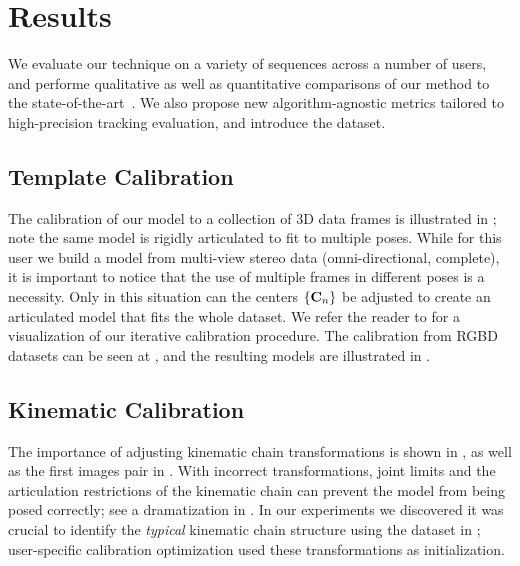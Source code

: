 
\section{Results}
\label{sec:results}
We evaluate our technique on a variety of sequences across a number of users, and performe qualitative as well as quantitative comparisons of our method to the state-of-the-art~\cite{qian2014realtime,sridhar2015fast,tagliasacchi2015robust,sharp2015accurate,taylor2016joint}. We also propose new algorithm-agnostic metrics tailored to high-precision tracking evaluation, and introduce the \handy{} dataset.

\subsection*{Template Calibration}
The calibration of our model to a collection of 3D data frames is illustrated in ; note the same model is rigidly articulated to fit to multiple poses. While for this user we build a model from multi-view stereo data (omni-directional, complete), it is important to notice that the use of multiple frames in different poses is a necessity. Only in this situation can the centers ${\{\mathbf{C}_n\}}$ be  adjusted to create an articulated model that  fits the whole dataset. We refer the reader to \VideoMVS{} for a visualization of our iterative calibration procedure. The calibration from RGBD datasets can be seen at \VideoCalibRGB{}, and the resulting models are illustrated in . 

\subsection*{Kinematic Calibration}
The importance of adjusting kinematic chain transformations is shown in , as well as the first images pair in . With incorrect  transformations, joint limits and the articulation restrictions of the kinematic chain can prevent the model from being posed correctly; see a dramatization in \VideoKinematic{}. In our experiments we discovered it was crucial to identify the \emph{typical} kinematic chain structure using the dataset in ; user-specific calibration optimization used these transformations as initialization.


